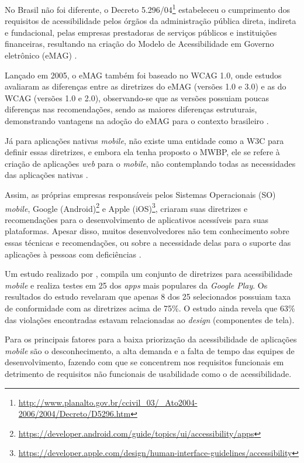 No Brasil não foi diferente, o Decreto 5.296/04\footnote{\url{http://www.planalto.gov.br/ccivil_03/_Ato2004-2006/2004/Decreto/D5296.htm}}
estabeleceu o cumprimento dos requisitos de acessibilidade pelos órgãos da administração pública direta, indireta e fundacional,
pelas empresas prestadoras de serviços públicos e instituições financeiras, resultando na criação do Modelo de Acessibilidade
em Governo eletrônico (eMAG) \cite{EMAG_2007}.

Lançado em 2005, o eMAG também foi baseado no WCAG 1.0, onde estudos avaliaram as diferenças entre as diretrizes do eMAG
(versões 1.0 e 3.0) e as do WCAG (versões 1.0 e 2.0), observando-se que as versões possuiam poucas
diferenças nas recomendações, sendo as maiores diferenças estruturais, demonstrando vantagens na adoção do eMAG para o
contexto brasileiro \cite{Bach_2009,Rocha_2013}.

Já para aplicações nativas \textit{mobile}, não existe uma entidade como a W3C para definir essas diretrizes, e embora
ela tenha proposto o MWBP, ele se refere à criação de aplicações \emph{web} para o \emph{mobile}, não contemplando todas
as necessidades das aplicações nativas \cite{W3C_2008}.

Assim, as próprias empresas responsáveis pelos Sistemas Operacionais (SO) \emph{mobile}, Google (Android)\footnote{\url{https://developer.android.com/guide/topics/ui/accessibility/apps}}
e Apple (iOS)\footnote{\url{https://developer.apple.com/design/human-interface-guidelines/accessibility}},
criaram suas diretrizes e recomendações para o desenvolvimento de aplicativos acessíveis para suas plataformas.
Apesar disso, muitos desenvolvedores não tem conhecimento sobre essas técnicas e recomendações, ou sobre a necessidade delas
para o suporte das aplicações à pessoas com deficiências \cite{Quispe2020,Bi2021}.

Um estudo realizado por , compila um conjunto de diretrizes para acessibilidade \textit{mobile} e realiza
testes em 25 dos \textit{apps} mais populares da \emph{Google Play}. Os resultados do estudo revelaram que apenas 8 dos 25 selecionados
possuiam taxa de conformidade com as diretrizes acima de 75\%. O estudo ainda revela que 63\% das violações encontradas estavam
relacionadas ao \textit{design} (componentes de tela).

Para  os principais fatores para a baixa priorização da acessibilidade de aplicações \textit{mobile}
são o desconhecimento, a alta demanda e a falta de tempo das equipes de desenvolvimento, fazendo com que se concentrem nos
requisitos funcionais em detrimento de requisitos não funcionais de usabilidade como o de acessibilidade.


